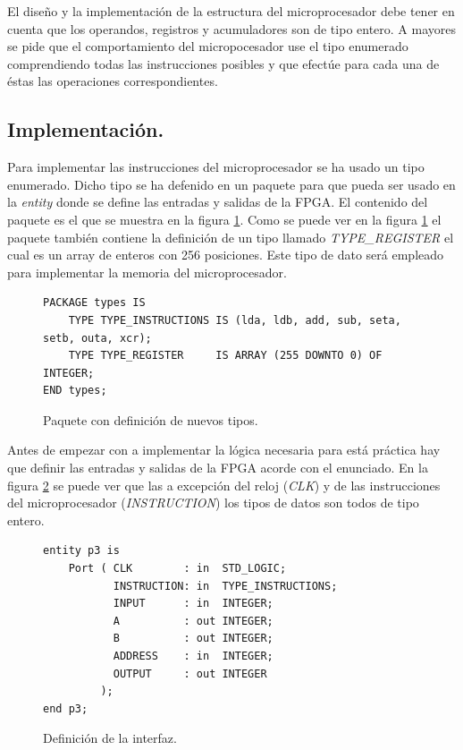 \documentclass{article}
\begin{document}
El diseño y la implementación de la estructura del microprocesador debe tener en cuenta que los operandos, registros y acumuladores son de tipo entero. A mayores se pide que el comportamiento del micropocesador use el tipo enumerado comprendiendo todas las instrucciones posibles y que efectúe para cada una de éstas las operaciones correspondientes.

\subsection{Implementación.}

Para implementar las instrucciones del microprocesador se ha usado un tipo enumerado. Dicho tipo se ha defenido en un paquete para que pueda ser usado en la \emph{entity} donde se define las entradas y salidas de la FPGA. El contenido del paquete es el que se muestra en la figura \ref{cod:p3:package}. Como se puede ver en la figura \ref{cod:p3:package} el paquete también contiene la definición de un tipo llamado \emph{TYPE\_REGISTER} el cual es un array de enteros con 256 posiciones. Este tipo de dato será empleado para implementar la memoria del microprocesador.


\begin{figure}[h]
	\begin{lstlisting}[style=vhdl]
PACKAGE types IS
	TYPE TYPE_INSTRUCTIONS IS (lda, ldb, add, sub, seta, setb, outa, xcr);
	TYPE TYPE_REGISTER     IS ARRAY (255 DOWNTO 0) OF INTEGER;
END types;
	\end{lstlisting}
	\caption{Paquete con definición de nuevos tipos.}
	\label{cod:p3:package}
\end{figure}

Antes de empezar con a implementar la lógica necesaria para está práctica hay que definir las entradas y salidas de la FPGA acorde con el enunciado. En la figura \ref{cod:p3:entity} se puede ver que las a excepción del reloj (\emph{CLK}) y de las instrucciones del microprocesador (\emph{INSTRUCTION}) los tipos de datos son todos de tipo entero.

\begin{figure}[h]
	\begin{lstlisting}[style=vhdl]
entity p3 is
    Port ( CLK        : in  STD_LOGIC;
           INSTRUCTION: in  TYPE_INSTRUCTIONS;
           INPUT      : in  INTEGER;
           A          : out INTEGER;
           B          : out INTEGER;
           ADDRESS    : in  INTEGER;
           OUTPUT     : out INTEGER
         );
end p3;
	\end{lstlisting}
	\caption{Definición de la interfaz.}
	\label{cod:p3:entity}
\end{figure}
\end{document}

